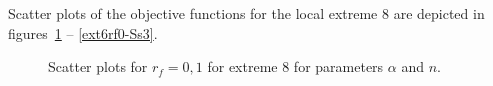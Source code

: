 \documentclass[review,times,3p,twocolumn,10pt]{elsarticle}
\begin{document}
Scatter plots of the objective functions for the local extreme 8 are depicted in figures~\ref{ext6rf0-an3} -- \ref{ext6rf0-Ss3}.

\begin{figure}[htb!]
\label{ext6rf0-an3}
\caption{Scatter plots for $r_f=0,1$ for extreme 8 for parameters $\alpha$ and $n$.}
\end{figure}
\end{document}
